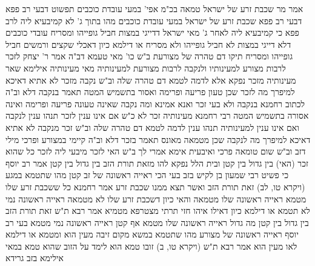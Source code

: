 \documentclass[12pt, openany]{book}
\begin{document}
{אמר מר שכבת זרע של ישראל טמאה בכ"מ אפי' במעי עובדת כוכבים תפשוט דבעי רב פפא דבעי רב פפא שכבת זרע של ישראל במעי עובדת כוכבים מהו 
בתוך ג' לא קמיבעיא ליה לרב פפא כי קמיבעיא ליה לאחר ג' מאי 
ישראל דדייגי במצות חביל גופייהו ומסריח עובדי כוכבים דלא דייגי במצות לא חביל גופייהו ולא מסריח או דילמא כיון דאכלי שקצים ורמשים חביל גופייהו ומסריח תיקו
דם טהרה של מצורעת ב"ש כו' מאי טעמא דב"ה אמר ר' יצחק לזכר לרבות מצורע למעינותיו ולנקבה לרבות מצורעת למעינותיה 
מאי מעינותיה אילימא שאר מעינותיה מזכר נפקא אלא לדמה לטמא דם טהרה שלה 
וב"ש נקבה מזכר לא אתיא דאיכא למיפרך מה לזכר שכן טעון פריעה ופרימה ואסור בתשמיש המטה תאמר בנקבה דלא 
וב"ה לכתוב רחמנא בנקבה ולא בעי זכר ואנא אמינא ומה נקבה שאינה טעונה פריעה ופרימה ואינה אסורה בתשמיש המטה רבי רחמנא מעינותיה זכר לא כ"ש 
אם אינו ענין לזכר תנהו ענין לנקבה ואם אינו ענין למעינותיה תנהו ענין לדמה לטמא דם טהרה שלה 
וב"ש זכר מנקבה לא אתיא דאיכא למיפרך מה לנקבה שכן מטמאה מאונס תאמר בזכר דלא 
וב"ה קיימי במצורע ופרכי מילי דזב וב"ש שום טומאה פרכי 
ואיבעית אימא אמרי לך ב"ש האי לזכר מיבעי ליה לזכר כל שהוא זכר (האי) בין גדול בין קטן ובית הלל נפקא להו מזאת תורת הזב בין גדול בין קטן 
אמר רב יוסף כי פשיט רבי שמעון בן לקיש בזב בעי הכי ראייה ראשונה של זב קטן מהו שתטמא במגע (ויקרא טו, לב) זאת תורת הזב ואשר תצא ממנו שכבת זרע אמר רחמנא
כל ששכבת זרע שלו מטמא ראייה ראשונה שלו מטמאה והאי כיון דשכבת זרע שלו לא מטמאה ראייה ראשונה נמי לא תטמא או דילמא כיון דאילו איהו חזי תרתי מצטרפא מטמיא 
אמר רבא ת"ש זאת תורת הזב בין גדול בין קטן מה גדול ראייה ראשונה שלו מטמא אף קטן ראייה ראשונה נמי מטמא 
בעי רב יוסף ראייה ראשונה של מצורע מהו שתטמא במשא מקום זיבה מעין הוא ומטמא או דילמא לאו מעין הוא 
אמר רבא ת"ש (ויקרא טו, ב) זובו טמא הוא לימד על הזוב שהוא טמא במאי אילימא בזב גרידא}
\end{document}
